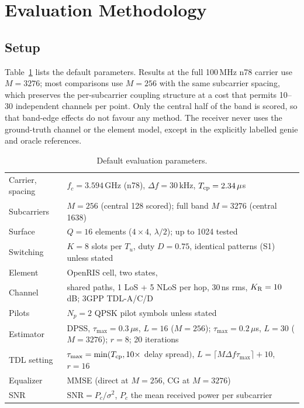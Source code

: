 \section{Evaluation Methodology}\label{sec:method}

\subsection{Setup}
Table~\ref{tab:params} lists the default parameters. Results at the full 100\,MHz n78
carrier use $M=3276$; most comparisons use $M=256$ with the same subcarrier spacing,
which preserves the per-subcarrier coupling structure at a cost that permits 10--30
independent channels per point. Only the central half of the band is scored, so that
band-edge effects do not favour any method. The receiver never uses the ground-truth
channel or the element model, except in the explicitly labelled genie and oracle references.

\begin{table}[!htbp]\centering
\caption{Default evaluation parameters.}\label{tab:params}
\begin{tabular}{ll}\toprule
Carrier, spacing & $f_c=3.594$\,GHz (n78), $\Delta f=30$\,kHz, $T_{\rm cp}=2.34\,\mu$s \\
Subcarriers & $M=256$ (central 128 scored); full band $M=3276$ (central 1638) \\
Surface & $Q=16$ elements ($4\times4$, $\lambda/2$); up to 1024 tested \\
Switching & $K=8$ slots per $T_u$, duty $D=0.75$, identical patterns (S1) unless stated \\
Element & OpenRIS cell, two states,~\cite[Table~I]{iudice2026} \\
Channel & shared paths, 1 LoS + 5 NLoS per hop, 30\,ns rms, $K_{\rm R}=10$\,dB; 3GPP TDL-A/C/D \\
Pilots & $N_p=2$ QPSK pilot symbols unless stated \\
Estimator & DPSS, $\tau_{\max}=0.3\,\mu$s, $L=16$ ($M=256$); $\tau_{\max}=0.2\,\mu$s, $L=30$ ($M=3276$); $r=8$; 20 iterations \\
TDL setting & $\tau_{\max}=\min(T_{\rm cp},10\times$ delay spread$)$, $L=\lceil M\Delta f\tau_{\max}\rceil+10$, $r=16$ \\
Equalizer & MMSE (direct at $M=256$, CG at $M=3276$) \\
SNR & $\mathrm{SNR}=P_c/\sigma^2$, $P_c$ the mean received power per subcarrier \\\bottomrule
\end{tabular}
\end{table}

